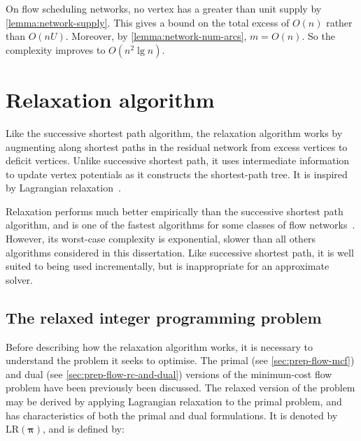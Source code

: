 \begin{remark}
On flow scheduling networks, no vertex has a greater than unit supply by \cref{lemma:network-supply}. This gives a bound on the total excess of $O(n)$ rather than $O(nU)$. Moreover, by \cref{lemma:network-num-arcs}, $m = O(n)$. So the complexity improves to $O(n^2 \lg n)$.
\end{remark}

\section{Relaxation algorithm} \label{sec:impl-relax}


Like the successive shortest path algorithm, the relaxation algorithm works by augmenting along shortest paths in the residual network from excess vertices to deficit vertices. Unlike successive shortest path, it uses intermediate information to update vertex potentials as it constructs the shortest-path tree. It is inspired by Lagrangian relaxation~\cite[ch.~16]{Ahuja:1993}\cite{Fisher:1981}.

Relaxation performs much better empirically than the successive shortest path algorithm, and is one of the fastest algorithms for some classes of flow networks~\cite{KiralyKovacs:2012}. However, its worst-case complexity is exponential, slower than all others algorithms considered in this dissertation\footnotemark. Like successive shortest path, it is well suited to being used incrementally, but is inappropriate for an approximate solver.

\subsection{The relaxed integer programming problem}
Before describing how the relaxation algorithm works, it is necessary to understand the problem it seeks to optimise. The primal (see \cref{sec:prep-flow-mcf}) and dual (see \cref{sec:prep-flow-rc-and-dual}) versions of the minimum-cost flow problem have been previously been discussed. The relaxed version of the problem may be derived by applying Lagrangian relaxation to the primal problem, and has characteristics of both the primal and dual formulations. It is denoted by $\mathrm{LR}(\boldsymbol{\pi})$, and is defined by:

